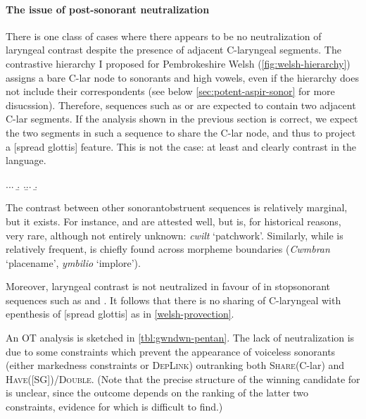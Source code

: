 \paragraph{The issue of post\hyp sonorant neutralization}
\label{sec:issue-posthyp-sonor}

There is one class of cases where there appears to be no neutralization of laryngeal contrast despite the presence of adjacent C-laryngeal segments. The contrastive hierarchy I proposed for Pembrokeshire Welsh (\cref{fig:welsh-hierarchy}) assigns a bare C-lar node to sonorants and high vowels, even if the hierarchy does not include their  correspondents (see below \cref{sec:potent-aspir-sonor} for more disucssion). Therefore, sequences such as \ipa{[ld]} or \ipa{[mp]} are expected to contain two adjacent C-lar segments. If the analysis shown in the previous section is correct, we expect the two segments in such a sequence to share the C-lar node, and thus to project a [spread glottis] feature. This is not the case: at least \ipa{[nt]} and \ipa{[nd]} clearly contrast in the language.

\ex.\a.\a.
\b.
\z.\b.\a.
\b.

The contrast between other sonorant\endash obstruent sequences is relatively marginal, but it exists. For instance, \ipa{[ld]} and \ipa{[ɬt]} are attested well, but \ipa{[lt]} is, for historical reasons, very rare, although not entirely unknown: \emph{cwilt} `patchwork'. Similarly, while \ipa{[mp]} is relatively frequent, \ipa{[mb]} is chiefly found across morpheme boundaries (\emph{Cwmbran} `placename', \emph{ymbilio} `implore').

Moreover, laryngeal contrast is not neutralized in favour of  in stop\endash sonorant sequences such as \ipa{[br]} and \ipa{[ɡl]}. It follows that there is no sharing of C-laryngeal with epenthesis of [spread glottis] as in \ref{welsh-provection}.

An OT analysis is sketched in \ref{tbl:gwndwn-pentan}. The lack of neutralization is due to some constraints which prevent the appearance of voiceless sonorants (either markedness constraints or \textsc{Dep\-Link}) outranking both \textsc{Share}(C-lar) and \textsc{Have}([SG])/\textsc{Double}. (Note that the precise structure of the winning candidate for  is unclear, since the outcome depends on the ranking of the latter two constraints, evidence for which is difficult to find.)

